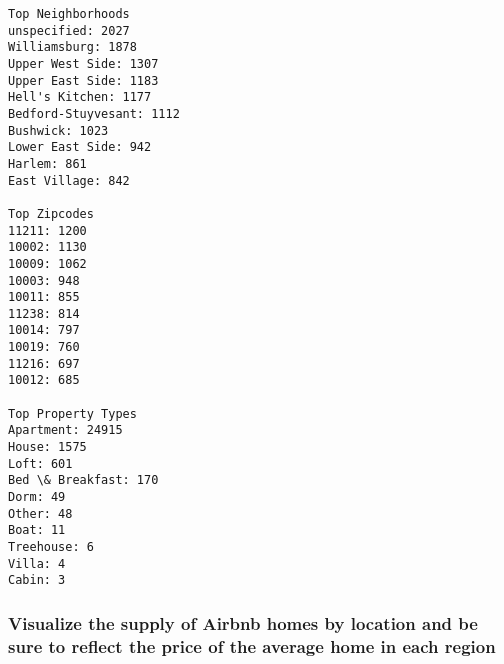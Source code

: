 \documentclass[11pt]{article}
\begin{document}
    \begin{Verbatim}[commandchars=\\\{\}]
Top Neighborhoods
unspecified: 2027
Williamsburg: 1878
Upper West Side: 1307
Upper East Side: 1183
Hell's Kitchen: 1177
Bedford-Stuyvesant: 1112
Bushwick: 1023
Lower East Side: 942
Harlem: 861
East Village: 842

Top Zipcodes
11211: 1200
10002: 1130
10009: 1062
10003: 948
10011: 855
11238: 814
10014: 797
10019: 760
11216: 697
10012: 685

Top Property Types
Apartment: 24915
House: 1575
Loft: 601
Bed \& Breakfast: 170
Dorm: 49
Other: 48
Boat: 11
Treehouse: 6
Villa: 4
Cabin: 3

    \end{Verbatim}

    \subsubsection{Visualize the supply of Airbnb homes by location and be
sure to reflect the price of the average home in each
region}\label{visualize-the-supply-of-airbnb-homes-by-location-and-be-sure-to-reflect-the-price-of-the-average-home-in-each-region}
\end{document}
